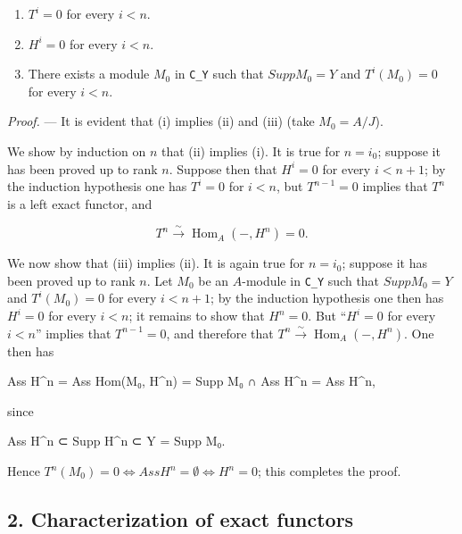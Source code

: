 \documentclass[
]{article}
\newenvironment{Shaded}{}{}
\newcommand{\NormalTok}[1]{#1}
\providecommand{\tightlist}{%
  \setlength{\itemsep}{0pt}\setlength{\parskip}{0pt}}
\begin{document}
\begin{enumerate}
\def\labelenumi{\arabic{enumi}.}
\tightlist
\item
  \(T^{i} = 0\) for every \(i < n\).
\item
  \(H^{i} = 0\) for every \(i < n\).
\item
  There exists a module \(M_{0}\) in \texttt{C\_Y} such that
  \(Supp M_{0} = Y\) and \(T^{i}(M_{0}) = 0\) for every \(i < n\).
\end{enumerate}

\emph{Proof.} --- It is evident that (i) implies (ii) and (iii) (take
\(M_{0} = A/J\)).

We show by induction on \(n\) that (ii) implies (i). It is true for
\(n = i_{0}\); suppose it has been proved up to rank \(n\). Suppose then
that \(H^{i} = 0\) for every \(i < n + 1\); by the induction hypothesis
one has \(T^{i} = 0\) for \(i < n\), but \(T^{n-1} = 0\) implies that
\(T^{n}\) is a left exact functor, and

\[
T^{n} \xrightarrow{\sim} \operatorname{Hom}_{A}(-, H^{n}) = 0.
\]

We now show that (iii) implies (ii). It is again true for \(n = i_{0}\);
suppose it has been proved up to rank \(n\). Let \(M_{0}\) be an
\(A\)-module in \texttt{C\_Y} such that \(Supp M_{0} = Y\) and
\(T^{i}(M_{0}) = 0\) for every \(i < n + 1\); by the induction
hypothesis one then has \(H^{i} = 0\) for every \(i < n\); it remains to
show that \(H^{n} = 0\). But ``\(H^{i} = 0\) for every \(i < n\)''
implies that \(T^{n-1} = 0\), and therefore that
\(T^{n} \xrightarrow{\sim} \operatorname{Hom}_{A}(-, H^{n})\). One then
has

\begin{Shaded}
\begin{Highlighting}[]
\NormalTok{Ass H\^{}n = Ass Hom(M₀, H\^{}n) = Supp M₀ ∩ Ass H\^{}n = Ass H\^{}n,}
\end{Highlighting}
\end{Shaded}

since

\begin{Shaded}
\begin{Highlighting}[]
\NormalTok{Ass H\^{}n ⊂ Supp H\^{}n ⊂ Y = Supp M₀.}
\end{Highlighting}
\end{Shaded}

Hence
\(T^{n}(M_{0}) = 0 \Leftrightarrow Ass H^{n} = \emptyset \Leftrightarrow H^{n} = 0\);
this completes the proof.

\subsection{2. Characterization of exact
functors}\label{characterization-of-exact-functors}
\end{document}
